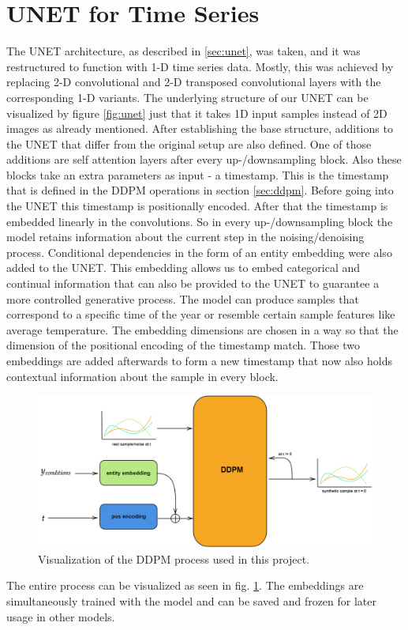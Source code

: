 \section{UNET for Time Series}
\label{sec:unet time series}
The UNET architecture, as described in \ref{sec:unet}, was taken, and it was restructured to function with 1-D time series data. Mostly, this was achieved by replacing 2-D convolutional and 2-D transposed convolutional 
layers with the corresponding 1-D variants. The underlying structure of our UNET can be visualized by figure \ref{fig:unet} just that it takes 1D input samples instead of 2D images as already mentioned.\newline
After establishing the base structure, additions to the UNET that differ from the original setup are also defined. One of those
additions are self attention layers after every up-/downsampling block. Also these blocks take an extra parameters
as input - a timestamp. This is the timestamp that is defined in the DDPM operations in section \ref{sec:ddpm}. Before going into the UNET this timestamp
is positionally encoded. After that the timestamp is embedded linearly in the convolutions. So in every up-/downsampling block the model retains information about the current step in the noising/denoising process.\newline
Conditional dependencies in the form of an entity embedding \cite{guo2016entity} were also added to the UNET. This embedding allows us to embed categorical and continual information that can also be provided to the UNET to guarantee
a more controlled generative process. The model can produce samples that correspond to a specific time of the year or resemble certain sample features like average temperature. The embedding dimensions are chosen in a way so that the 
dimension of the positional encoding of the timestamp match. Those two embeddings are added afterwards to form a new timestamp that now also holds contextual information about the sample in every block. 
\begin{figure}
    \centering
    \includegraphics[width=\textwidth]{images/unet1d.png}
    \caption{Visualization of the DDPM process used in this project.}
    \label{fig:unet1d}
\end{figure}
The entire process can be visualized as seen in fig. \ref{fig:unet1d}. The embeddings are simultaneously trained with the model and can be saved and frozen for later usage in other models.
